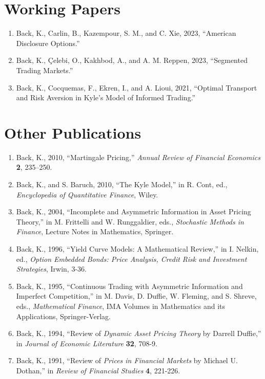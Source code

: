 \documentclass[margin, 11pt]{res}
\begin{document}
\begin{resume}
\section{\sc Working Papers}
\begin{enumerate}
\item Back, K., Carlin, B., Kazempour, S. M., and C. Xie, 2023, ``American Disclosure Options.''
\item Back, K., \c{C}elebi, O., Kakhbod, A., and A. M. Reppen, 2023, ``Segmented Trading Markets.''
\item Back, K., Cocquemas, F., Ekren, I., and A. Lioui, 2021, ``Optimal Transport and Risk Aversion in Kyle's Model of Informed Trading.''

\end{enumerate}

\section{\sc Other Publications}
\begin{enumerate}
\item Back, K., 2010, ``Martingale Pricing,'' \textit{Annual Review of Financial Economics} \textbf{2}, 235--250.
\item Back, K., and S. Baruch, 2010, ``The Kyle Model,'' in R. Cont, ed., \textit{Encyclopedia of Quantitative Finance}, Wiley.
\item Back, K., 2004, ``Incomplete and Asymmetric Information in Asset Pricing Theory,'' in M. Frittelli and W. Runggaldier, eds., \textit{Stochastic Methods in Finance}, Lecture Notes in Mathematics, Springer.
\item Back, K., 1996, ``Yield Curve Models: A Mathematical Review,''
in I. Nelkin, ed., {\em Option Embedded
Bonds: Price Analysis, Credit Risk and Investment Strategies}, Irwin, 3-36.
\item Back, K., 1995, ``Continuous Trading with Asymmetric Information and Imperfect
Competition,'' in M. Davis, D. Duffie, W.
Fleming, and S. Shreve, eds., {\em Mathematical Finance},
IMA Volumes in Mathematics
and its Applications, Springer-Verlag.
\item Back, K., 1994, ``Review of {\em Dynamic Asset Pricing Theory\/} by Darrell Duffie,'' in
{\em Journal of Economic Literature\/} {\bf 32}, 708-9.
\item Back, K., 1991, ``Review of {\em Prices in Financial Markets\/} by Michael U.
Dothan,'' in {\em Review of Financial Studies\/} {\bf 4}, 221-226.
\end{enumerate}


\end{resume}
\end{document}
